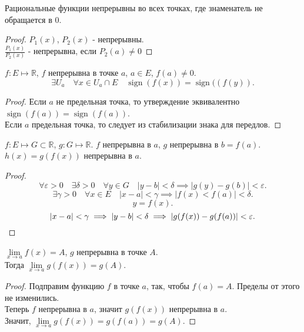 \documentclass[11pt, oneside]{article}   	%
\DeclareMathOperator{\sgn}{sign}
\begin{document}
    \begin{tlemma}
        Рациональные функции непрерывны во всех точках, где знаменатель не обращается в $0$.
        \begin{proof}
            $P_1(x)$, $ P_2(x)$ - непрерывны.\\
            $\frac{P_1(x)}{P_2(x)}$ - непрерывна, если $P_2(a) \neq 0$
        \end{proof}
    \end{tlemma}
    \begin{theorem}
        $f: E \mapsto \mathbb{R}$, $f$ непрерывна в точке $a$, $a\in E$, $f(a) \neq 0$.
        \[ \exists{U_a}\quad \forall{x\in U_a\cap E}\quad \sgn(f(x)) = \sgn((f(y))   .\]
        \begin{proof}
            Если $a$ не предельная точка, то утверждение эквивалентно $\sgn(f(a)) = \sgn(f(a))$.\\
            Если $a$ предельная точка, то следует из стабилизации знака для передлов.
        \end{proof}
    \end{theorem}
    \begin{theorem}
        $f: E \mapsto G \subset \mathbb{R}$, $g: G \mapsto \mathbb{R}$. $f$ непрерывна в $a$, $g$ непрерывна в $b=f(a)$.\\
        $h(x) = g(f(x))$ непрерывна в $a$.
        \begin{proof}
            \[ \forall{\varepsilon>0}\quad \exists{\delta>0}\quad \forall{y\in G}\quad |y-b|<\delta \implies |g(y)-g(b)| < \varepsilon    .\]
            \[ \exists{\gamma > 0}\quad \forall{x\in E}\quad |x-a|<\gamma \implies |f(x) < f(a)| < \delta  .\]
            \[ y=f(x) .\]
            \[ |x-a|<\gamma \implies |y-b|<\delta \implies |g(f(x))-g(f(a))|<\varepsilon .\qedhere\] 
        \end{proof}
    \end{theorem}
    \begin{tlemma}
        $\lim\limits_{x \to a} f(x) = A$, $g$ непрерывна в точке $A$.\\
        Тогда $\lim\limits_{x \to a} g(f(x)) = g(A)$.\\
        \begin{proof}
            Подправим функцию $f$ в точке $a$, так, чтобы $f(a) = A$. Пределы от этого не изменились.\\
            Теперь $f$ непрерывна в $a$, значит $g(f(x))$ непрерывна в $a$.\\
            Значит, $\lim\limits_{x \to a} g(f(x)) = g(f(a)) = g(A)$.
        \end{proof}
    \end{tlemma}
\end{document}
